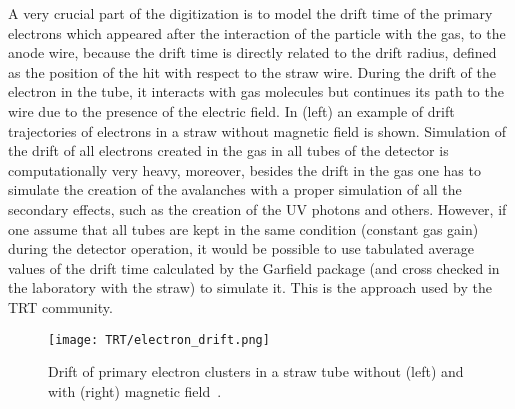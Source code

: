A very crucial part of the digitization is to model the drift time of the primary electrons which appeared after the interaction of the particle with the gas, to the anode wire, because the drift time is directly related to the drift radius, defined as the position of the hit with respect to the straw wire.
During the drift of the electron in the tube, it interacts with gas molecules but continues its path to the wire due to the presence of the electric field.
In  (left) an example of drift trajectories of electrons in a straw without magnetic field is shown.
Simulation of the drift of all electrons created in the gas in all tubes of the detector is computationally very heavy,
moreover, besides the drift in the gas one has to simulate the creation of the avalanches with a proper simulation of all the secondary effects,
such as the creation of the UV photons and others. However, if one assume that all tubes are kept in the same condition (constant gas gain) during the detector operation, it would
be possible to use tabulated average values of the drift time calculated by the Garfield package (and cross checked in the laboratory with the straw) to simulate it.
This is the approach used by the TRT community. 

\begin{figure}
\begin{center}
 \texttt{[image: TRT/electron\_drift.png]}
\caption {Drift of primary electron clusters in a straw tube without (left) and with (right) magnetic field~\cite{cwetanski_thesis}. 
}
\label{fig:clusterDriftInTube}
\end{center}
\end{figure}

